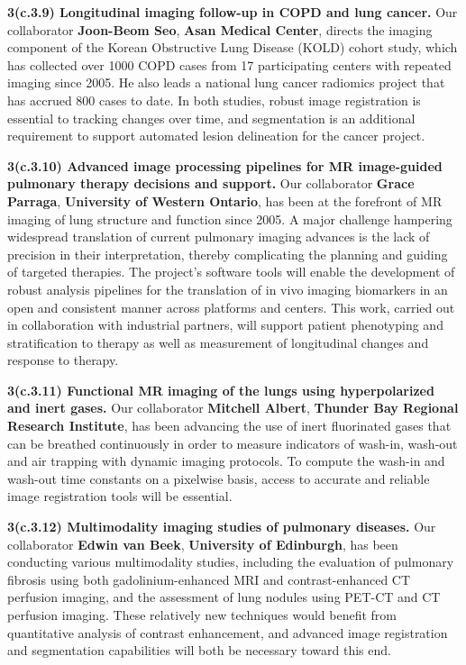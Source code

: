 \documentclass[11pt,]{article}
\begin{document}
\textbf{3(c.3.9) Longitudinal imaging follow-up in COPD and lung
cancer.} Our collaborator \textbf{Joon-Beom Seo}, \textbf{Asan Medical
Center}, directs the imaging component of the Korean Obstructive Lung
Disease (KOLD) cohort study, which has collected over 1000 COPD cases
from 17 participating centers with repeated imaging since 2005. He also
leads a national lung cancer radiomics project that has accrued 800
cases to date. In both studies, robust image registration is essential
to tracking changes over time, and segmentation is an additional
requirement to support automated lesion delineation for the cancer
project.

\textbf{3(c.3.10) Advanced image processing pipelines for MR
image-guided pulmonary therapy decisions and support.} Our collaborator
\textbf{Grace Parraga}, \textbf{University of Western Ontario}, has been
at the forefront of MR imaging of lung structure and function since
2005. A major challenge hampering widespread translation of current
pulmonary imaging advances is the lack of precision in their
interpretation, thereby complicating the planning and guiding of
targeted therapies. The project's software tools will enable the
development of robust analysis pipelines for the translation of in vivo
imaging biomarkers in an open and consistent manner across platforms and
centers. This work, carried out in collaboration with industrial
partners, will support patient phenotyping and stratification to therapy
as well as measurement of longitudinal changes and response to therapy.

\textbf{3(c.3.11) Functional MR imaging of the lungs using
hyperpolarized and inert gases.} Our collaborator \textbf{Mitchell
Albert}, \textbf{Thunder Bay Regional Research Institute}, has been
advancing the use of inert fluorinated gases that can be breathed
continuously in order to measure indicators of wash-in, wash-out and air
trapping with dynamic imaging protocols. To compute the wash-in and
wash-out time constants on a pixelwise basis, access to accurate and
reliable image registration tools will be essential.

\textbf{3(c.3.12) Multimodality imaging studies of pulmonary diseases.}
Our collaborator \textbf{Edwin van Beek}, \textbf{University of
Edinburgh}, has been conducting various multimodality studies, including
the evaluation of pulmonary fibrosis using both gadolinium-enhanced MRI
and contrast-enhanced CT perfusion imaging, and the assessment of lung
nodules using PET-CT and CT perfusion imaging. These relatively new
techniques would benefit from quantitative analysis of contrast
enhancement, and advanced image registration and segmentation
capabilities will both be necessary toward this end.
\end{document}
